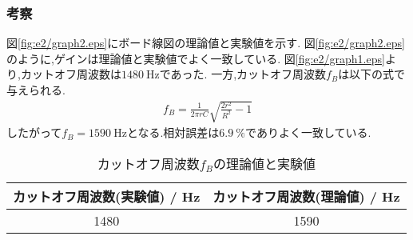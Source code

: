\subsubsection{考察}
図\ref{fig:e2/graph2.eps}にボード線図の理論値と実験値を示す.
図\ref{fig:e2/graph2.eps}のように,ゲインは理論値と実験値でよく一致している.
図\ref{fig:e2/graph1.eps}より,カットオフ周波数は$1480~\si{\hertz}$であった.
一方,カットオフ周波数$f_B$は以下の式で与えられる.
\begin{align}
  f_B=\frac{1}{2\pi rC}\sqrt{\frac{2r^2}{R^2}-1}
\end{align}
したがって$f_B=1590~\si{\hertz}$となる.相対誤差は$6.9~\%$でありよく一致している.
\begin{table}[h]
  \caption{カットオフ周波数$f_B$の理論値と実験値}
  \label{tab:}
  \centering
  \begin{tabular}{cc}
    \hline
    カットオフ周波数(実験値) / \si{\hertz}&カットオフ周波数(理論値) / \si{\hertz}\\
    \hline \hline
    1480&1590\\
    \hline
  \end{tabular}
\end{table}
